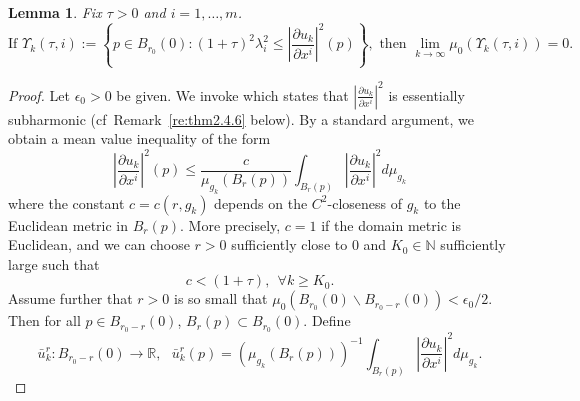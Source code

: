 \documentclass[12pt]{amsart}
\newtheorem{lemma}[theorem]{Lemma}
\theoremstyle{definition}
\numberwithin{equation}{section}
\newcommand{\R}{\mathbb R}
\newcommand{\N}{\mathbb N}
\begin{document}
\begin{lemma} \label{upsilonprime}
Fix $\tau >0$ and $i=1, \dots, m$.  
\[
\mbox{If }
\Upsilon_k(\tau, i):=\left\{ p \in  B_{r_0}(0):   (1+ \tau)^2 \lambda_i^2  \leq  \left|\frac{\partial u_k}{\partial x^i} \right|^2(p)\right\},
\mbox{ 
then }
\lim_{k \to \infty}\mu_0(\Upsilon_k(\tau, i))=0.
\]
\end{lemma}
\begin{proof}
Let $\epsilon_0>0$ be given.
We invoke \cite[last paragraph of the proof of Theorem 2.4.6]{korevaar-schoen1} which states that $\left|\frac{\partial u_k}{\partial x^i} \right|^2$ is essentially subharmonic (cf~Remark~\ref{re:thm2.4.6} below).  By a standard argument, we obtain a mean value inequality of the form
\begin{equation} \label{almostMVI}
\left|\frac{\partial u_k}{\partial x^i} \right|^2(p)  \leq \frac{c}{\mu_{g_k}(B_r(p))}\int_{B_r(p)}  \left|\frac{\partial u_k}{\partial x^i} \right|^2 d\mu_{g_k}
\end{equation}
where the constant $c=c(r,g_k)$ depends on the $C^2$-closeness of $g_k$ to the Euclidean metric in $B_r(p)$.  More precisely,  $c=1$ if the domain metric is Euclidean, and  we can choose $r>0$ sufficiently close to $0$ and $K_0 \in \N$ sufficiently large such that 
\[
c <(1+\tau), \ \ \forall k  \geq K_0.
\]
Assume further that $r>0$ is so small that $\mu_0(B_{r_0}(0)\backslash B_{r_0-r}(0))<\epsilon_0/2$. Then for all $p \in B_{r_0-r}(0)$, $B_r(p) \subset B_{r_0}(0)$. Define 
\[
\bar u^r_k:B_{r_0-r}(0) \rightarrow \R, \ \ \ \bar u^r_k(p) = (\mu_{g_k}(B_r(p)))^{-1}\int_{B_r(p)}  \left|\frac{\partial u_k}{\partial x^i} \right|^2 d\mu_{g_k}.
\]



\end{proof}
\end{document}
